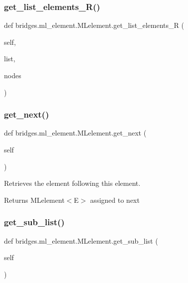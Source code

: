 \subsubsection{\texorpdfstring{get\+\_\+list\+\_\+elements\+\_\+\+R()}{get\_list\_elements\_R()}}
{\footnotesize\ttfamily def bridges.\+ml\+\_\+element.\+M\+Lelement.\+get\+\_\+list\+\_\+elements\+\_\+R (\begin{DoxyParamCaption}\item[{}]{self,  }\item[{}]{list,  }\item[{}]{nodes }\end{DoxyParamCaption})}

\mbox{\label{classbridges_1_1ml__element_1_1_m_lelement_aca0cc01e2041a3d283a3e1ceca3050da}} 
\subsubsection{\texorpdfstring{get\+\_\+next()}{get\_next()}}
{\footnotesize\ttfamily def bridges.\+ml\+\_\+element.\+M\+Lelement.\+get\+\_\+next (\begin{DoxyParamCaption}\item[{}]{self }\end{DoxyParamCaption})}



Retrieves the element following this element. 

\begin{DoxyReturn}{Returns}
M\+Lelement$<$\+E$>$ assigned to next 
\end{DoxyReturn}
\mbox{\label{classbridges_1_1ml__element_1_1_m_lelement_a9a11300019a637de7b3f4a756998ac32}} 
\subsubsection{\texorpdfstring{get\+\_\+sub\+\_\+list()}{get\_sub\_list()}}
{\footnotesize\ttfamily def bridges.\+ml\+\_\+element.\+M\+Lelement.\+get\+\_\+sub\+\_\+list (\begin{DoxyParamCaption}\item[{}]{self }\end{DoxyParamCaption})}



